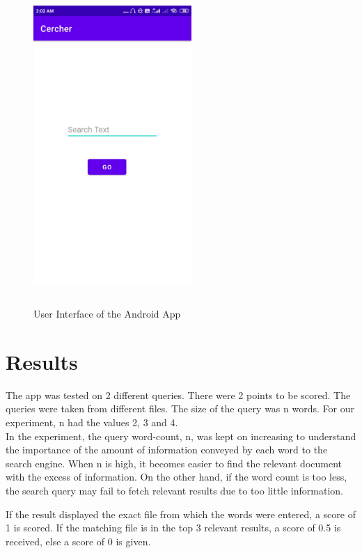 \documentclass[12pt]{article}
\begin{document}
	\begin{figure}[H]
		\includegraphics[width=6cm, height=12cm]{app_screen.jpeg}
		\caption{User Interface of the Android App}
	\end{figure}
	
	\pagebreak
	
	\section{Results}
	The app was tested on 2 different queries. There were 2 points to be scored. The queries were taken from different files. The size of the query was n words. For our experiment, n had the values 2, 3 and 4.\\
	
	In the experiment, the query word-count, n, was kept on increasing to understand the importance of the amount of information conveyed by each word to the search engine. When n is high, it becomes easier to find the relevant document with the excess of information. On the other hand, if the word count is too less, the search query may fail to fetch relevant results due to too little information. 
	
	If the result displayed the exact file from which the words were entered, a score of 1 is scored. If the matching file is in the top 3 relevant results, a score of 0.5 is received, else a score of 0 is given. \\
	
\end{document}
